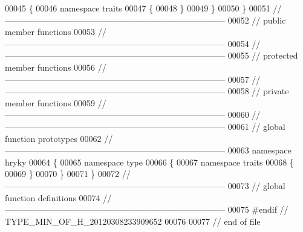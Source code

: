 \begin{DoxyCode}
00045 \{
00046 \textcolor{keyword}{namespace }traits
00047 \{
00048 \}
00049 \}
00050 \}
00051 \textcolor{comment}{//
      ------------------------------------------------------------------------------}
00052 \textcolor{comment}{// public member functions}
00053 \textcolor{comment}{//
      ------------------------------------------------------------------------------}
00054 \textcolor{comment}{//
      ------------------------------------------------------------------------------}
00055 \textcolor{comment}{// protected member functions}
00056 \textcolor{comment}{//
      ------------------------------------------------------------------------------}
00057 \textcolor{comment}{//
      ------------------------------------------------------------------------------}
00058 \textcolor{comment}{// private member functions}
00059 \textcolor{comment}{//
      ------------------------------------------------------------------------------}
00060 \textcolor{comment}{//
      ------------------------------------------------------------------------------}
00061 \textcolor{comment}{// global function prototypes}
00062 \textcolor{comment}{//
      ------------------------------------------------------------------------------}
00063 \textcolor{keyword}{namespace }hryky
00064 \{
00065 \textcolor{keyword}{namespace }type
00066 \{
00067 \textcolor{keyword}{namespace }traits
00068 \{
00069 \}
00070 \}
00071 \}
00072 \textcolor{comment}{//
      ------------------------------------------------------------------------------}
00073 \textcolor{comment}{// global function definitions}
00074 \textcolor{comment}{//
      ------------------------------------------------------------------------------}
00075 \textcolor{preprocessor}{#endif // TYPE\_MIN\_OF\_H\_20120308233909652}
00076 \textcolor{preprocessor}{}
00077 \textcolor{comment}{// end of file}
\end{DoxyCode}

